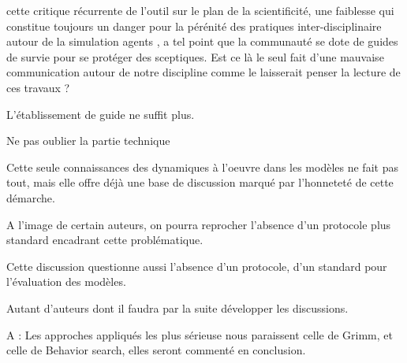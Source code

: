 cette critique récurrente de l'outil sur le plan de la scientificité, une faiblesse qui constitue toujours un danger pour la pérénité des pratiques inter-disciplinaire autour de la simulation agents \autocite[220]{Squazzoni2010}, a tel point que la communauté se dote de guides de survie pour se protéger des sceptiques. \autocite{Waldherr2013} Est ce là le seul fait d'une mauvaise communication autour de notre discipline comme le laisserait penser la lecture de ces travaux ? 





L'établissement de guide ne suffit plus.


Ne pas oublier la partie technique


Cette seule connaissances des dynamiques à l'oeuvre dans les modèles ne fait pas tout, mais elle offre déjà une base de discussion marqué par l'honneteté de cette démarche.

A l'image de certain auteurs, on pourra reprocher l'absence d'un protocole plus standard encadrant cette problématique. 

Cette discussion questionne aussi l'absence d'un protocole, d'un standard pour l'évaluation des modèles. %

Autant d'auteurs \autocite{Richiardi2006} \autocite[198]{Fagiolo2007} \autocite{Moss2008} \autocite{Windrum2007} \autocite{Barlas1996} \autocite{Amblard2003} \autocite{OSullivan2004} \autocite{Doran2000} \autocite{Crooks2012} \autocite{Rouchier2013} dont il faudra par la suite développer les discussions.  



A : Les approches appliqués les plus sérieuse nous paraissent celle de Grimm, et celle de Behavior search, elles seront commenté en conclusion.


